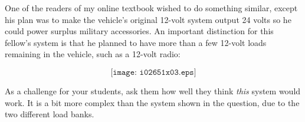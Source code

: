 \vskip 10pt

One of the readers of my online textbook wished to do something similar, except his plan was to make the vehicle's original 12-volt system output 24 volts so he could power surplus military accessories.  An important distinction for this fellow's system is that he planned to have more than a few 12-volt loads remaining in the vehicle, such as a 12-volt radio:

$$\texttt{[image: i02651x03.eps]}$$

As a challenge for your students, ask them how well they think {\it this} system would work.  It is a bit more complex than the system shown in the question, due to the two different load banks.












